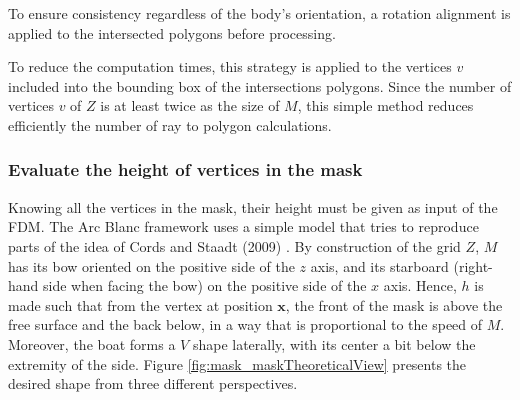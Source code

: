\documentclass[final]{jcgt}
\def\Framework{The Arc Blanc framework\xspace}
\begin{document}
To ensure consistency regardless of the body's orientation, a rotation alignment is applied to the intersected polygons before processing.

To reduce the computation times, this strategy is applied to the vertices $v$ included into the bounding box of the intersections polygons.
Since the number of vertices $v$ of $Z$ is at least twice as the size of $M$, this simple method reduces efficiently the number of ray to polygon calculations.

\subsubsection{Evaluate the height of vertices in the mask}
\label{subsubsec:heightMask}
Knowing all the vertices in the mask, their height must be given as input of the FDM.
\Framework uses a simple model that tries to reproduce parts of the idea of Cords and Staadt (2009) \cite{cordsRealTimeOpenWater2009}.
By construction of the grid $Z$, $M$ has its bow oriented on the positive side of the $z$ axis, and its starboard (right-hand side when facing the bow) on the positive side of the $x$ axis.
Hence, $h$ is made such that from the vertex at position $\mathbf x$, the front of the mask is above the free surface and the back below, in a way that is proportional to the speed of $M$.
Moreover, the boat forms a $V$ shape laterally, with its center a bit below the extremity of the side. Figure \ref{fig:mask_maskTheoreticalView} presents the desired shape from three different perspectives.
\end{document}
